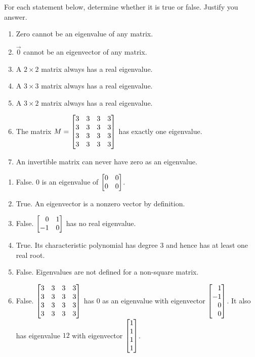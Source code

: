\begin{exercises}
\begin{problist}
		\prob For each statement below, determine whether it is true or false. Justify
		you answer.
		\begin{enumerate}
			\item Zero cannot be an eigenvalue of any matrix.

			\item $\vec 0$ cannot be an eigenvector of any matrix.

			\item A $2\times 2$ matrix always has a real eigenvalue.

			\item A $3\times 3$ matrix always has a real eigenvalue.

			\item A $3\times 2$ matrix always has a real eigenvalue.

			\item The matrix $M = \mat{3&3&3&3\\3&3&3&3\\3&3&3&3\\3&3&3&3}$ has
				exactly one eigenvalue.

			\item An invertible matrix can never have zero as an eigenvalue.
		\end{enumerate}


		\begin{solution}

			\begin{enumerate}
				\item False. $0$ is an eigenvalue of $\mat{0 & 0 \\ 0 & 0}$.

				\item True. An eigenvector is a nonzero vector by definition.

				\item False. $\mat{0 & 1 \\ -1 & 0}$ has no real eigenvalue.

				\item True. Its characteristic polynomial has degree $3$ and
					hence has at least one real root.

				\item False. Eigenvalues are not defined for a non-square matrix.

				\item False. $\mat{3 & 3 & 3 & 3 \\ 3 & 3 & 3 & 3\\3 & 3 &
					3 & 3\\3 & 3 & 3 & 3}$ has $0$ as an eigenvalue with
					eigenvector $\mat{1 \\ -1 \\ 0 \\ 0}$. It also has
					eigenvalue $12$ with eigenvector
					$\mat{1 \\ 1 \\ 1 \\ 1}$.


\end{enumerate}
\end{solution}
\end{problist}
\end{exercises}
